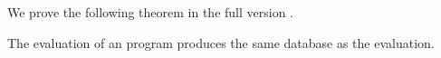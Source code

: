 
We prove the following theorem in the full version \citep{egglog-preprint}.

\begin{theorem}
    The \seminaive evaluation of an \egglog program
    produces the same database as the \naive
    evaluation.
\end{theorem}







